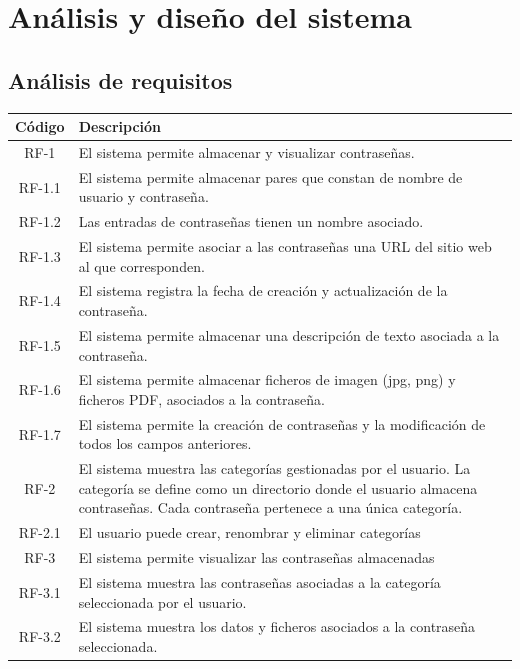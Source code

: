 \documentclass{article}
\begin{document}
\section{Análisis y diseño del sistema}

\subsection{Análisis de requisitos}

\begin{table}[H]
    \centering
    \begin{tabular}{| c | p{30em} |}
    \hline
        Código &  Descripción  \\ \hline
        RF-1 & El sistema permite almacenar y visualizar contraseñas. \\ \hline
        RF-1.1 & El sistema permite almacenar pares que constan de nombre de usuario y contraseña.  \\ \hline
        RF-1.2 & Las entradas de contraseñas tienen un nombre asociado. \\ \hline
        RF-1.3 & El sistema permite asociar a las contraseñas una URL del sitio web al que corresponden. \\ \hline
        RF-1.4 & El sistema registra la fecha de creación y actualización de la contraseña. \\ \hline
        RF-1.5 & El sistema permite almacenar una descripción de texto asociada a la contraseña. \\ \hline
        RF-1.6 & El sistema permite almacenar ficheros de imagen (jpg, png) y ficheros PDF, asociados a la contraseña. \\ \hline
        RF-1.7 & El sistema permite la creación de contraseñas y la modificación de todos los campos anteriores. \\ \hline
        RF-2 & El sistema muestra las categorías gestionadas por el usuario. La categoría se define como un directorio donde el usuario almacena contraseñas. Cada contraseña pertenece a una única categoría.\\ \hline
        RF-2.1 & El usuario puede crear, renombrar y eliminar categorías \\ \hline
        RF-3 & El sistema permite visualizar las contraseñas almacenadas\\ \hline
        RF-3.1 & El sistema muestra las contraseñas asociadas a la categoría seleccionada por el usuario. \\ \hline
        RF-3.2 & El sistema muestra los datos y ficheros asociados a la contraseña seleccionada. \\ \hline

\end{tabular}
\end{table}
\end{document}
